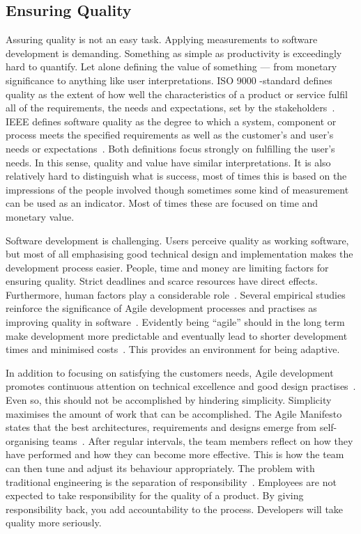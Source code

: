 \documentclass[english]{tktltiki2}
\begin{document}
\subsection{Ensuring Quality}

Assuring quality is not an easy task. Applying measurements to software development is demanding. Something as simple as productivity is exceedingly hard to quantify. Let alone defining the value of something — from monetary significance to anything like user interpretations. ISO 9000 -standard defines quality as the extent of how well the characteristics of a product or service fulfil all of the requirements, the needs and expectations, set by the stakeholders~\cite{ISO9000}. IEEE defines software quality as the degree to which a system, component or process meets the specified requirements as well as the customer’s and user’s needs or expectations~\cite{IEEE1074}. Both definitions focus strongly on fulfilling the user’s needs. In this sense, quality and value have similar interpretations. It is also relatively hard to distinguish what is success, most of times this is based on the impressions of the people involved though sometimes some kind of measurement can be used as an indicator. Most of times these are focused on time and monetary value.

Software development is challenging. Users perceive quality as working software, but most of all emphasising good technical design and implementation makes the development process easier. People, time and money are limiting factors for ensuring quality. Strict deadlines and scarce resources have direct effects. Furthermore, human factors play a considerable role~\cite{DD08}. Several empirical studies reinforce the significance of Agile development processes and practises as improving quality in software~\cite{DD08, SS10, DNB12}. Evidently being “agile” should in the long term make development more predictable and eventually lead to shorter development times and minimised costs~\cite{DD08}. This provides an environment for being adaptive.

In addition to focusing on satisfying the customers needs, Agile development promotes continuous attention on technical excellence and good design practises~\cite{BBB01b}. Even so, this should not be accomplished by hindering simplicity. Simplicity maximises the amount of work that can be accomplished. The Agile Manifesto states that the best architectures, requirements and designs emerge from self-organising teams~\cite{BBB01b}. After regular intervals, the team members reflect on how they have performed and how they can become more effective. This is how the team can then tune and adjust its behaviour appropriately. The problem with traditional engineering is the separation of responsibility~\cite{Pop02}. Employees are not expected to take responsibility for the quality of a product. By giving responsibility back, you add accountability to the process. Developers will take quality more seriously.
\end{document}
